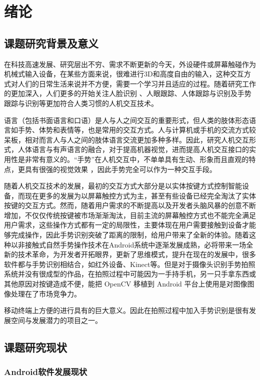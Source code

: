 \documentclass{XDBAthesis}
\begin{document}
\else
\fi
\chapter{绪论}
\section{课题研究背景及意义}

在科技高速发展、研究层出不穷、需求不断更新的今天，外设硬件或屏幕触碰作为机械式输入设备，在某些方面来说，很难进行3D和高度自由的输入，这种交互方式对人们的日常生活来说并不方便，需要一个学习并且适应的过程。随着研究工作的更加深入，人们更多的开始关注人脸识别 \cite{erol2007vision,lee1995model}、人眼跟踪、人体跟踪与识别及手势跟踪与识别等更加符合人类习惯的人机交互技术。

语言（包括书面语言和口语）是人与人之间交互的重要形式，但人类的肢体形态语言如手势、体势和表情等，也是常用的交互方式。人与计算机或手机的交流方式较呆板，相对而言人与人之间的肢体语言交流更加多种多样。因此，研究人机交互形式，人体语言与有声语言的融合，对于提高机器视觉，进而提高人机交互接口的实用性是非常有意义的。“手势”在人机交互中，不单单具有生动、形象而且直观的特点，更具有很强的视觉效果\cite{何阳清2004基于几何特征的手势识别算法研究} ，因此手势完全可以作为一种交互手段。

随着人机交互技术的发展，最初的交互方式大部分是以实体按键方式控制智能设备，而现在更多的发展为以屏幕触控方式为主，甚至有些设备已经完全淘汰了实体按键的交互方式。然而，随着用户需求的不断提高以及开发者头脑风暴的创意不断增加，不仅仅传统按键被市场渐渐淘汰，目前主流的屏幕触控方式也不能完全满足用户需求，这些操作方式都有一定的局限性，主要体现在用户需要接触到设备才能够完成操作，因此手势识别突破了距离的限制，给用户带来了全新的体验。随着这种以非接触式自然手势操作技术在Android系统中逐渐发展成熟，必将带来一场全新的技术革命，为开发者开拓眼界，更新了思维模式，提升在现在的发展中，很多软件都与手势识别相结合，如红外设备、Kinect等。但是对于摄像头识别手势拍照系统并没有很成型的作品，在拍照过程中可能因为一手持手机，另一只手拿东西或其他原因对按键造成不便，能把 OpenCV 移植到 Android 平台上使用是对图像图像处理在了市场竞争力。

移动终端上方便的进行具有的巨大意义。因此在拍照过程中加入手势识别是很有发展空间与发展潜力的项目之一。

\section{课题研究现状}

\subsection{Android软件发展现状}
\end{document}
